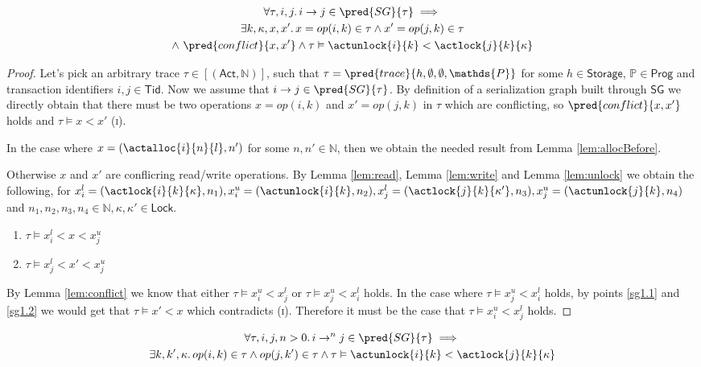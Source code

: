 \lem \label{lem:sg1}
\begin{gather*}
\forall \tau, i, j \ldotp i \rightarrow j \in \pred{SG}{\tau} \implies \\
\exists k, \kappa, x, x' \ldotp x = op(i, k) \in \tau \land x' = op(j, k) \in \tau \\
\land\ \pred{conflict}{x, x'} \land \tau \vDash \actunlock{i}{k} < \actlock{j}{k}{\kappa}
\end{gather*}
\begin{proof}
Let's pick an arbitrary trace $\tau \in [(\mathsf{Act}, \mathds{N})]$, such that $\tau = \pred{trace}{h, \emptyset, \emptyset, \mathds{P}}$ for some $h \in \mathsf{Storage}$, $\mathds{P} \in \mathsf{Prog}$ and transaction identifiers $i, j \in \mathsf{Tid}$. Now we assume that $i \rightarrow j \in \pred{SG}{\tau}$. By definition of a serialization graph built through $\mathsf{SG}$ we directly obtain that there must be two operations $x = op(i, k)$ and $x' = op(j, k)$ in $\tau$ which are conflicting, so $\pred{conflict}{x, x'}$ holds and $\tau \vDash x < x'$ (\textsc{i}).

In the case where $x = (\actalloc{i}{n}{l}, n')$ for some $n, n' \in \mathds{N}$, then we obtain the needed result from Lemma \ref{lem:allocBefore}.

Otherwise $x$ and $x'$ are conflicring read/write operations. By Lemma \ref{lem:read}, Lemma \ref{lem:write} and Lemma \ref{lem:unlock} we obtain the following, for $x_i^l = (\actlock{i}{k}{\kappa}, n_1), x_i^u = (\actunlock{i}{k}, n_2), x_j^l = (\actlock{j}{k}{\kappa'}, n_3), x_j^u = (\actunlock{j}{k}, n_4)$ and $n_1, n_2, n_3, n_4 \in \mathds{N}, \kappa, \kappa' \in \mathsf{Lock}$.
\begin{enumerate}
	\item \label{sg1.1} $\tau \vDash x_i^l < x < x_j^u$
	\item \label{sg1.2} $\tau \vDash x_j^l < x' < x_j^u$
\end{enumerate}
By Lemma \ref{lem:conflict} we know that either $\tau \vDash x_i^u < x_j^l$ or $\tau \vDash x_j^u < x_i^l$ holds. In the case where $\tau \vDash x_j^u < x_i^l$ holds, by points \ref{sg1.1} and \ref{sg1.2} we would get that $\tau \vDash x' < x$ which contradicts (\textsc{i}). Therefore it must be the case that $\tau \vDash x_i^u < x_j^l$ holds.
\end{proof}

\lem \label{lem:sg2}
\begin{gather*}
\forall \tau, i, j, n > 0 \ldotp i \rightarrow^n j \in \pred{SG}{\tau} \implies \\
\exists k, k', \kappa \ldotp op(i, k) \in \tau \land op(j, k') \in \tau \land \tau \vDash \actunlock{i}{k} < \actlock{j}{k}{\kappa}
\end{gather*}

